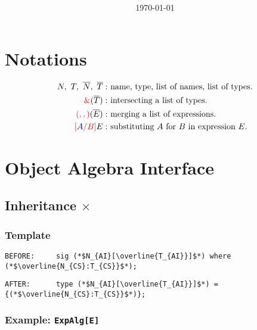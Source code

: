 \documentclass{article}
\title{\huge\textmd{\bf\thistitle}}
\date{}
\author{\today}
\newcommand{\red}[1]{\textcolor{red}{#1}}
\newcommand{\blue}[1]{\textcolor{blue}{#1}}
\begin{document}
\begin{spacing}{1.1}
\maketitle \thispagestyle{empty}


\section*{Notations}

\begin{align*}
N,\ T,\ \overline{N},\ \overline{T}:&\textrm{ name, type, list of names, list of types.}\\
\red{\&}(\overline{T}):&\textrm{ intersecting a list of types.}\\
\red{(,,)}(\overline{E}):&\textrm{ merging a list of expressions.}\\
\red{[}\blue{A}\red{/B]}E:&\textrm{ substituting }A\textrm{ for }B\textrm{ in expression }E.
\end{align*}

\section{Object Algebra Interface}

\subsection{Inheritance $\times$}

\subsubsection{Template}

\begin{lstlisting}[numbers=none]
BEFORE:     sig (*$N_{AI}[\overline{T_{AI}}]$*) where (*$\overline{N_{CS}:T_{CS}}$*);
\end{lstlisting}
\begin{lstlisting}[numbers=none]
AFTER:      type (*$N_{AI}[\overline{T_{AI}}]$*) = {(*$\overline{N_{CS}:T_{CS}}$*)};
\end{lstlisting}

\subsubsection{Example: \lstinline{ExpAlg[E]}}


\end{spacing}
\end{document}
